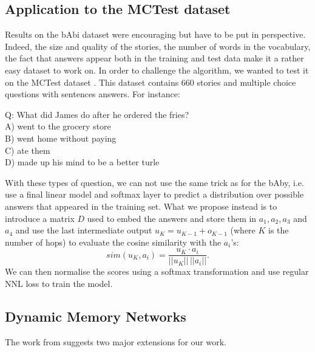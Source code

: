 \documentclass[twoside,11pt]{article}
\begin{document}
\subsection{Application to the MCTest dataset}
Results on the bAbi dataset were encouraging but have to be put in perspective. Indeed, the size and quality of the stories, the number of words in the vocabulary, the fact that answers appear both in the training and test data make it a rather easy dataset to work on. In order to challenge the algorithm, we wanted to test it on the MCTest dataset \cite{mctest}. This dataset contains 660 stories and multiple choice questions with sentences answers. For instance:
\begin{framed}
\begin{center}
Q:  What did James do after he ordered the fries?\\
A) went to the grocery store\\
B) went home without paying\\
C) ate them\\
D) made up his mind to be a better turle\\
\end{center}
\end{framed}
\noindent With these types of question, we can not use the same trick as for the bAby, i.e. use a final linear model and softmax layer to predict a distribution over possible answers that appeared in the training set. What we propose instead is to introduce a matrix $D$ used to embed the answers and store them in $a_1, a_2, a_3$ and $a_4$ and use the last intermediate output $u_K = u_{K-1} + o_{K-1}$ (where $K$ is the number of hops) to evaluate the cosine similarity with the $a_i$'s:
$$sim(u_K,a_i) = \frac{u_K \cdot a_i}{||u_K||\,||a_i||}.$$ We can then normalise the scores using a softmax transformation and use regular NNL loss to train the model.

\subsection{Dynamic Memory Networks}

The work from \cite{dmn} suggests two major extensions for our work. 
\end{document}
